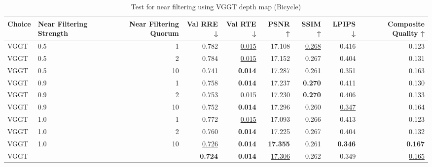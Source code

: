 \begin{table}[H]
\caption{Test for near filtering using VGGT depth map (Bicycle)}
\label{tab:99_near_filtering_bicycle}
\begin{tabular}{llrrrrrrr}
\toprule
Choice & Near Filtering Strength & Near Filtering Quorum & Val RRE ↓ & Val RTE ↓ & PSNR ↑ & SSIM ↑ & LPIPS ↓ & Composite Quality ↑ \\
\midrule
VGGT & 0.5 & 1 & 0.782 & \underline{0.015} & 17.108 & \underline{0.268} & 0.416 & 0.123 \\
VGGT & 0.5 & 2 & 0.784 & \underline{0.015} & 17.152 & 0.267 & 0.404 & 0.131 \\
VGGT & 0.5 & 10 & 0.741 & \textbf{0.014} & 17.287 & 0.261 & 0.351 & 0.163 \\
VGGT & 0.9 & 1 & 0.758 & \textbf{0.014} & 17.237 & \textbf{0.270} & 0.411 & 0.130 \\
VGGT & 0.9 & 2 & 0.753 & \underline{0.015} & 17.230 & \textbf{0.270} & 0.406 & 0.133 \\
VGGT & 0.9 & 10 & 0.752 & \textbf{0.014} & 17.296 & 0.260 & \underline{0.347} & 0.164 \\
VGGT & 1.0 & 1 & 0.772 & \underline{0.015} & 17.093 & 0.266 & 0.413 & 0.123 \\
VGGT & 1.0 & 2 & 0.760 & \textbf{0.014} & 17.225 & 0.267 & 0.404 & 0.132 \\
VGGT & 1.0 & 10 & \underline{0.726} & \textbf{0.014} & \textbf{17.355} & 0.261 & \textbf{0.346} & \textbf{0.167} \\
VGGT &  &  & \textbf{0.724} & \textbf{0.014} & \underline{17.306} & 0.262 & 0.349 & \underline{0.165} \\
\bottomrule
\end{tabular}
\end{table}
